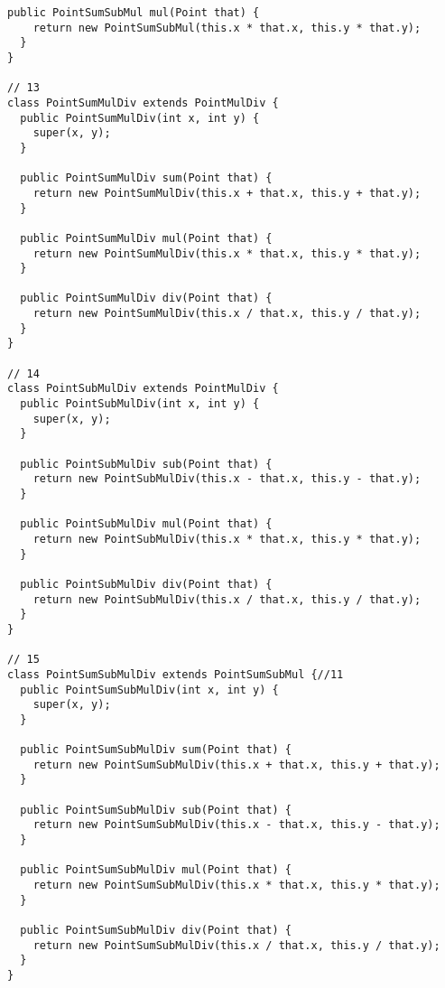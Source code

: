 \begin{lstlisting}[basicstyle=\tiny]
  public PointSumSubMul mul(Point that) {
    return new PointSumSubMul(this.x * that.x, this.y * that.y);
  }
}

// 13
class PointSumMulDiv extends PointMulDiv {
  public PointSumMulDiv(int x, int y) {
    super(x, y);
  }

  public PointSumMulDiv sum(Point that) {
    return new PointSumMulDiv(this.x + that.x, this.y + that.y);
  }

  public PointSumMulDiv mul(Point that) {
    return new PointSumMulDiv(this.x * that.x, this.y * that.y);
  }

  public PointSumMulDiv div(Point that) {
    return new PointSumMulDiv(this.x / that.x, this.y / that.y);
  }
}

// 14
class PointSubMulDiv extends PointMulDiv {
  public PointSubMulDiv(int x, int y) {
    super(x, y);
  }

  public PointSubMulDiv sub(Point that) {
    return new PointSubMulDiv(this.x - that.x, this.y - that.y);
  }

  public PointSubMulDiv mul(Point that) {
    return new PointSubMulDiv(this.x * that.x, this.y * that.y);
  }

  public PointSubMulDiv div(Point that) {
    return new PointSubMulDiv(this.x / that.x, this.y / that.y);
  }
}

// 15
class PointSumSubMulDiv extends PointSumSubMul {//11
  public PointSumSubMulDiv(int x, int y) {
    super(x, y);
  }

  public PointSumSubMulDiv sum(Point that) {
    return new PointSumSubMulDiv(this.x + that.x, this.y + that.y);
  }

  public PointSumSubMulDiv sub(Point that) {
    return new PointSumSubMulDiv(this.x - that.x, this.y - that.y);
  }

  public PointSumSubMulDiv mul(Point that) {
    return new PointSumSubMulDiv(this.x * that.x, this.y * that.y);
  }

  public PointSumSubMulDiv div(Point that) {
    return new PointSumSubMulDiv(this.x / that.x, this.y / that.y);
  }
}
\end{lstlisting}

